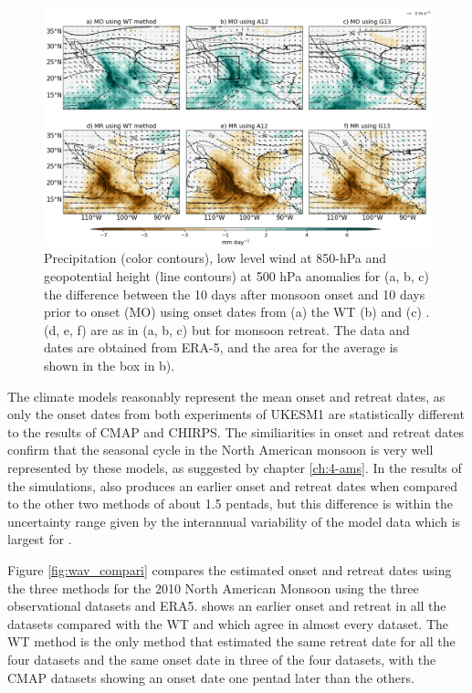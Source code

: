 \begin{figure}[t!]
\centering
 \includegraphics[width=\linewidth]{figures/wav_fig6.png}
\caption[Precipitation anomalies during North American monsoon onset]{  Precipitation (color contours), low level wind at 850-hPa and geopotential height (line contours) at 500 hPa anomalies for (a, b, c) the difference between the 10 days after monsoon onset and 10 days prior to onset (MO) using onset dates from (a) the WT (b) \cite{arias2012} and (c) \cite{geil2013}. (d, e, f) are as in (a, b, c) but for monsoon retreat. The data and dates are obtained from ERA-5, and the area for the average is shown in the box in b). }
\label{fig:wav_fig6}
\end{figure}

The climate models reasonably represent the mean onset and retreat dates, as only the onset dates from both experiments of UKESM1 are statistically different to the results of CMAP and CHIRPS. The similiarities in onset and retreat dates confirm that the seasonal cycle in the North American monsoon is very well represented by these models, as suggested by chapter \ref{ch:4-ams}. In the results of the simulations,  also produces an earlier onset and retreat dates when compared to the other two methods of about 1.5 pentads, but this difference is within the uncertainty range given by the interannual variability of the model data which is largest for  .  

Figure \ref{fig:wav_compari} compares the estimated onset and retreat dates using the three methods for the 2010 North American Monsoon  using the three observational datasets and ERA5.  shows an earlier onset and retreat in all the datasets compared with the WT and  which agree in almost every dataset. The WT method is the only method that estimated the same retreat date for all the four datasets and the same onset date in three of the four datasets, with the CMAP datasets showing an onset date one pentad later than the others. %

